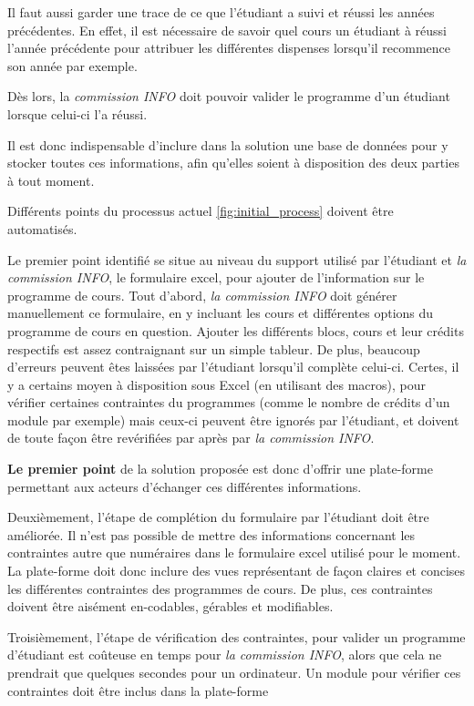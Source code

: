 Il faut aussi garder une trace de ce que l'étudiant a suivi et réussi les années précédentes. En effet, il est nécessaire de savoir quel cours un étudiant à réussi l'année précédente pour attribuer les différentes dispenses lorsqu'il recommence son année par exemple.

Dès lors, la \textit{commission INFO} doit pouvoir valider le programme d'un étudiant lorsque celui-ci l'a réussi. 

Il est donc indispensable d'inclure dans la solution une base de données pour y stocker toutes ces informations, afin qu'elles soient à disposition des deux parties à tout moment.

Différents points du processus actuel \ref{fig:initial_process} doivent être automatisés.

Le premier point identifié se situe au niveau du support utilisé par l'étudiant et \textit{la commission INFO}, le formulaire excel, pour ajouter de l'information sur le programme de cours. Tout d'abord, \textit{la commission INFO} doit générer manuellement ce formulaire, en y incluant les cours et différentes options du programme de cours en question. Ajouter les différents blocs, cours et leur crédits respectifs est assez contraignant sur un simple tableur. De plus, beaucoup d'erreurs peuvent êtes laissées par l'étudiant lorsqu'il complète celui-ci. Certes, il y a certains moyen à disposition sous Excel (en utilisant des macros), pour vérifier certaines contraintes du programmes (comme le nombre de crédits d'un module par exemple) mais ceux-ci peuvent être ignorés par l'étudiant, et doivent de toute façon être revérifiées par après par \textit{la commission INFO}. 

\textbf{Le premier point} de la solution proposée est donc d’offrir une plate-forme permettant aux acteurs d'échanger ces différentes informations.

Deuxièmement, l'étape de complétion du formulaire par l'étudiant doit être améliorée. Il n'est pas possible de mettre des informations concernant les contraintes autre que numéraires dans le formulaire excel utilisé pour le moment. La plate-forme doit donc inclure des vues représentant de façon claires et concises les différentes contraintes des programmes de cours. De plus, ces contraintes doivent être aisément en-codables, gérables et modifiables. 

Troisièmement, l'étape de vérification des contraintes, pour valider un programme d'étudiant est coûteuse en temps pour \textit{la commission INFO}, alors que cela ne prendrait que quelques secondes pour un ordinateur. Un module pour vérifier ces contraintes doit être inclus dans la plate-forme

